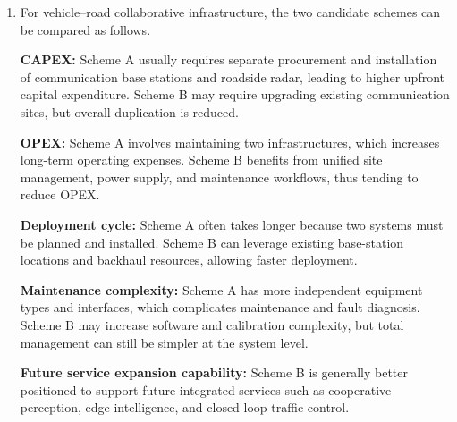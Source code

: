 \begin{enumerate}[label=\textbf{\arabic*.}, leftmargin=*]
\begin{enumerate}[label=(\alph*)]
        \item \textbf{Target-resolution requirements:} \\
        High-resolution sensing may require large bandwidth, long coherent observation, or specially designed waveforms. If these requirements are incompatible with communication needs, integrated operation may be suboptimal.

        \item \textbf{Communication-link quality requirements:} \\
        In scenarios with very strict communication reliability, latency, or throughput requirements, the system may need to prioritize communication performance, leaving limited flexibility for sensing integration.
    \end{enumerate}

    Therefore, ISAC spectral gain is most likely to hold when resource conflicts are manageable, interference can be controlled, sensing requirements are compatible with communication signals, and the communication link has enough design margin.

    \item 
    For vehicle--road collaborative infrastructure, the two candidate schemes can be compared as follows.

    \textbf{CAPEX:} Scheme A usually requires separate procurement and installation of communication base stations and roadside radar, leading to higher upfront capital expenditure. Scheme B may require upgrading existing communication sites, but overall duplication is reduced.

    \textbf{OPEX:} Scheme A involves maintaining two infrastructures, which increases long-term operating expenses. Scheme B benefits from unified site management, power supply, and maintenance workflows, thus tending to reduce OPEX.

    \textbf{Deployment cycle:} Scheme A often takes longer because two systems must be planned and installed. Scheme B can leverage existing base-station locations and backhaul resources, allowing faster deployment.

    \textbf{Maintenance complexity:} Scheme A has more independent equipment types and interfaces, which complicates maintenance and fault diagnosis. Scheme B may increase software and calibration complexity, but total management can still be simpler at the system level.

    \textbf{Future service expansion capability:} Scheme B is generally better positioned to support future integrated services such as cooperative perception, edge intelligence, and closed-loop traffic control.


\end{enumerate}
